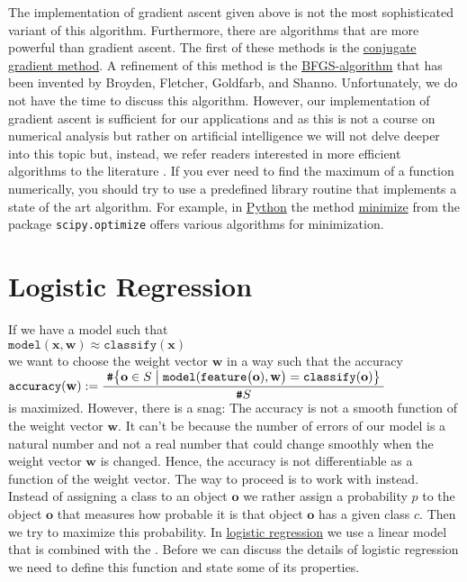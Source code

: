 The implementation of gradient ascent given above is not the most sophisticated variant of this algorithm.
Furthermore, there are algorithms that are more powerful than gradient ascent.  The first of these methods is the
\href{https://en.wikipedia.org/wiki/Conjugate_gradient_method}{conjugate gradient method}.  A
refinement of this method is the
\href{https://en.wikipedia.org/wiki/Broyden-Fletcher-Goldfarb-Shanno_algorithm}{BFGS-algorithm} that
has been invented by Broyden, Fletcher, Goldfarb, and Shanno.  Unfortunately, we do not have the
time to discuss this algorithm.
However, our implementation of gradient ascent is sufficient for our applications and as this is not a course on numerical
analysis but rather on artificial intelligence we will not delve deeper into this topic but, instead, we refer
readers interested in more efficient algorithms to the literature \cite{snyman:2005}.  If you ever need to find
the maximum of a function numerically, you should try to use a predefined library routine that implements a
state of the art algorithm.  For example, in \href{https://www.python.org}{Python} the method
\href{https://docs.scipy.org/doc/scipy/reference/generated/scipy.optimize.minimize.html#scipy.optimize.minimize}{minimize}
from the package \texttt{scipy.optimize} offers various algorithms for minimization.

\section{Logistic Regression}
If we have a model such that 
\\[0.2cm]
\hspace*{1.3cm}
$\mathtt{model}(\mathbf{x}, \mathbf{w}) \approx \mathtt{classify}(\mathbf{x})$
\\[0.2cm]
we want to choose the weight vector $\mathbf{w}$ in a way such that the accuracy 
\\[0.2cm]
\hspace*{1.3cm}
$\displaystyle \mathtt{accuracy}(\mathbf{w}) := 
\frac{\;\texttt{\#} \bigl\{ \mathbf{o} \in S \bigm| \mathtt{model}(\mathtt{feature}\bigl(\mathbf{o}),\mathbf{w}\bigr) = \mathtt{classify}(\mathbf{o})\bigr\}\;}{\texttt{\#} S}$
\\[0.2cm]
is maximized.  However, there is a snag:  The accuracy is not a smooth function of the weight vector
$\mathbf{w}$.  It can't be because the number of errors of our model is a natural number and not a real number
that could change smoothly when the weight vector $\mathbf{w}$ is changed.  Hence, the accuracy is not differentiable as a function
of the weight vector.  The way to proceed is to work with  instead.  Instead of assigning a
class to an object $\mathbf{o}$ we rather assign a probability $p$ to the object $\mathbf{o}$ that measures how
probable it is that object $\mathbf{o}$ has a given class $c$.  Then we try to maximize this probability.  In
\href{https://en.wikipedia.org/wiki/Logistic_regression}{logistic regression} we use a linear model that is 
combined with the .  Before we can discuss the details of logistic regression we need to
define this function and state some of its properties.  

